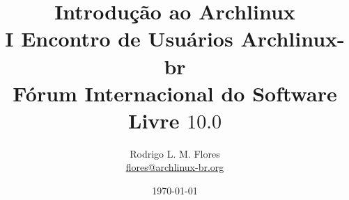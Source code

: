 \documentclass{beamer}
\title{Introdução ao Archlinux\\I Encontro de Usuários Archlinux-br\\Fórum Internacional do Software Livre $10.0$}
\author{Rodrigo L. M. Flores \\ \url{flores@archlinux-br.org}}
\institute{Projeto Archlinux-BR}
\begin{document}
\date{\today}

\frame{\titlepage}










\end{document}
